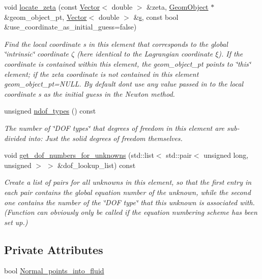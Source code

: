 \begin{DoxyCompactItemize}
void \hyperlink{classoomph_1_1FSIHermiteBeamElement_ae56f8245dbbb641c98d326780ff9400d}{locate\+\_\+zeta} (const \hyperlink{classoomph_1_1Vector}{Vector}$<$ double $>$ \&zeta, \hyperlink{classoomph_1_1GeomObject}{Geom\+Object} $\ast$\&geom\+\_\+object\+\_\+pt, \hyperlink{classoomph_1_1Vector}{Vector}$<$ double $>$ \&\hyperlink{cfortran_8h_ab7123126e4885ef647dd9c6e3807a21c}{s}, const bool \&use\+\_\+coordinate\+\_\+as\+\_\+initial\+\_\+guess=false)
\begin{DoxyCompactList}\small\item\em Find the local coordinate s in this element that corresponds to the global \char`\"{}intrinsic\char`\"{} coordinate $ \zeta $ (here identical to the Lagrangian coordinate $ \xi $). If the coordinate is contained within this element, the geom\+\_\+object\+\_\+pt points to \char`\"{}this\char`\"{} element; if the zeta coordinate is not contained in this element geom\+\_\+object\+\_\+pt=N\+U\+LL. By default don\textquotesingle{}t use any value passed in to the local coordinate s as the initial guess in the Newton method. \end{DoxyCompactList}\item 
unsigned \hyperlink{classoomph_1_1FSIHermiteBeamElement_a61ce78842e8e4d60b9f015eee813e162}{ndof\+\_\+types} () const
\begin{DoxyCompactList}\small\item\em The number of \char`\"{}\+D\+O\+F types\char`\"{} that degrees of freedom in this element are sub-\/divided into\+: Just the solid degrees of freedom themselves. \end{DoxyCompactList}\item 
void \hyperlink{classoomph_1_1FSIHermiteBeamElement_aa8015d263121249c737f862f63044a1b}{get\+\_\+dof\+\_\+numbers\+\_\+for\+\_\+unknowns} (std\+::list$<$ std\+::pair$<$ unsigned long, unsigned $>$ $>$ \&dof\+\_\+lookup\+\_\+list) const
\begin{DoxyCompactList}\small\item\em Create a list of pairs for all unknowns in this element, so that the first entry in each pair contains the global equation number of the unknown, while the second one contains the number of the \char`\"{}\+D\+O\+F type\char`\"{} that this unknown is associated with. (Function can obviously only be called if the equation numbering scheme has been set up.) \end{DoxyCompactList}\end{DoxyCompactItemize}
\subsection*{Private Attributes}
\begin{DoxyCompactItemize}
\item 
bool \hyperlink{classoomph_1_1FSIHermiteBeamElement_aee929633dfedcd059ed2f4236739be40}{Normal\+\_\+points\+\_\+into\+\_\+fluid}
\end{DoxyCompactItemize}
